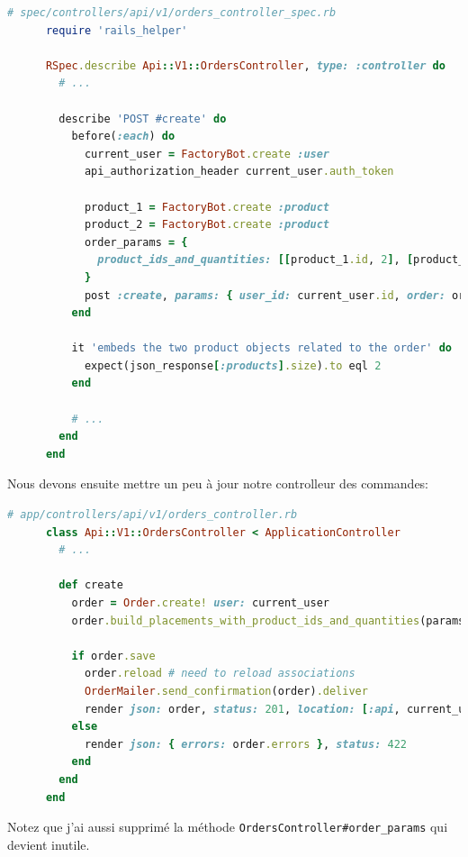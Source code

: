 \documentclass[]{report}
\begin{document}
    \begin{scriptsize}
      \begin{lstlisting}[language=ruby]
      # spec/controllers/api/v1/orders_controller_spec.rb
      require 'rails_helper'

      RSpec.describe Api::V1::OrdersController, type: :controller do
        # ...

        describe 'POST #create' do
          before(:each) do
            current_user = FactoryBot.create :user
            api_authorization_header current_user.auth_token

            product_1 = FactoryBot.create :product
            product_2 = FactoryBot.create :product
            order_params = {
              product_ids_and_quantities: [[product_1.id, 2], [product_2.id, 3]]
            }
            post :create, params: { user_id: current_user.id, order: order_params }
          end

          it 'embeds the two product objects related to the order' do
            expect(json_response[:products].size).to eql 2
          end

          # ...
        end
      end
      \end{lstlisting}
    \end{scriptsize}

    Nous devons ensuite mettre un peu à jour notre controlleur des commandes:

    \begin{scriptsize}
      \begin{lstlisting}[language=ruby]
      # app/controllers/api/v1/orders_controller.rb
      class Api::V1::OrdersController < ApplicationController
        # ...

        def create
          order = Order.create! user: current_user
          order.build_placements_with_product_ids_and_quantities(params[:order][:product_ids_and_quantities])

          if order.save
            order.reload # need to reload associations
            OrderMailer.send_confirmation(order).deliver
            render json: order, status: 201, location: [:api, current_user, order]
          else
            render json: { errors: order.errors }, status: 422
          end
        end
      end
      \end{lstlisting}
    \end{scriptsize}

    Notez que j'ai aussi supprimé la méthode \verb|OrdersController#order_params| qui devient inutile.
\end{document}
